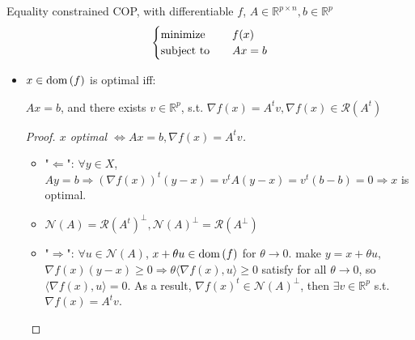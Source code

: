 \begin{remark}
    Equality constrained COP, with differentiable $f$, $A \in \mathbb{R}^{p \times n}, b \in \mathbb{R}^p$ \[\begin{cases}
        \operatorname{minimize} \quad &f(x)\\
        \operatorname{subject\ to} \quad &Ax = b
    \end{cases}\]
    \begin{itemize}
        \item $x \in \operatorname{dom}{(f)}$ is optimal iff:\begin{center}
            $Ax = b$, and there exists $v \in \mathbb{R}^p$, s.t. $\nabla f(x) = A^tv, \nabla f(x) \in \mathcal{R}(A^t)$
        \end{center}
        \begin{proof}[Proof. $x$ optimal $\Longleftrightarrow Ax = b, \nabla f(x) = A^tv$]
            \text{}
            \begin{itemize}
                \item "$\Longleftarrow$": $\forall y \in X$, $Ay = b \Longrightarrow (\nabla f(x))^t(y - x) = v^tA(y - x) = v^t(b - b) = 0 \Longrightarrow x$ is optimal.
                \item $\mathcal{N}(A) = \mathcal{R}(A^t)^\perp, \mathcal{N}(A)^\perp = \mathcal{R}(A^\perp)$
                \item "$\Longrightarrow$": $\forall u \in \mathcal{N}(A)$, $x + \theta u \in \operatorname{dom}{(f)}$ for $\theta \to 0$. make $y = x + \theta u$, $\nabla f(x)(y - x) \ge 0 \Longrightarrow \theta \langle\nabla f(x), u\rangle \ge 0$ satisfy for all $\theta \to 0$, so $\langle\nabla f(x), u\rangle = 0$. As a result, $\nabla f(x)^t \in \mathcal{N}(A)^\perp$, then $\exists v \in \mathbb{R}^p$ s.t. $\nabla f(x) = A^tv$.
            \end{itemize}
        \end{proof}
    \end{itemize}
\end{remark}

